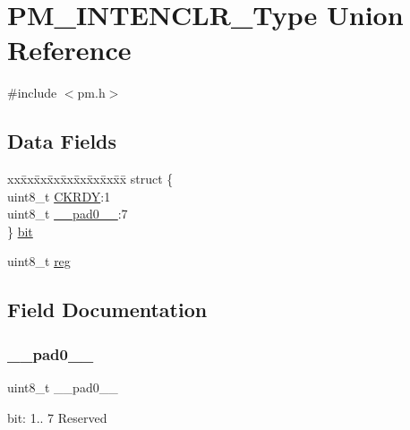 \hypertarget{union_p_m___i_n_t_e_n_c_l_r___type}{}\section{P\+M\+\_\+\+I\+N\+T\+E\+N\+C\+L\+R\+\_\+\+Type Union Reference}
\label{union_p_m___i_n_t_e_n_c_l_r___type}


{\ttfamily \#include $<$pm.\+h$>$}

\subsection*{Data Fields}
\begin{DoxyCompactItemize}
\item 
\begin{tabbing}
xx\=xx\=xx\=xx\=xx\=xx\=xx\=xx\=xx\=\kill
struct \{\\
\>uint8\_t \mbox{\hyperlink{union_p_m___i_n_t_e_n_c_l_r___type_adbe5f3203d63c6431c43561e9fed6517}{CKRDY}}:1\\
\>uint8\_t \mbox{\hyperlink{union_p_m___i_n_t_e_n_c_l_r___type_a8b4eebe79ded0459acec2f4950102ba3}{\_\_pad0\_\_}}:7\\
\} \mbox{\hyperlink{union_p_m___i_n_t_e_n_c_l_r___type_a7cd4538402f1ca385b2475b73ae26e95}{bit}}\\

\end{tabbing}\item 
uint8\+\_\+t \mbox{\hyperlink{union_p_m___i_n_t_e_n_c_l_r___type_a9428adc9af4653a2050e2536b55dec8d}{reg}}
\end{DoxyCompactItemize}


\subsection{Field Documentation}
\mbox{\label{union_p_m___i_n_t_e_n_c_l_r___type_a8b4eebe79ded0459acec2f4950102ba3}} 
\subsubsection{\texorpdfstring{\_\_pad0\_\_}{\_\_pad0\_\_}}
{\footnotesize\ttfamily uint8\+\_\+t \+\_\+\+\_\+pad0\+\_\+\+\_\+}

bit\+: 1.. 7 Reserved \mbox{\label{union_p_m___i_n_t_e_n_c_l_r___type_a7cd4538402f1ca385b2475b73ae26e95}} 

